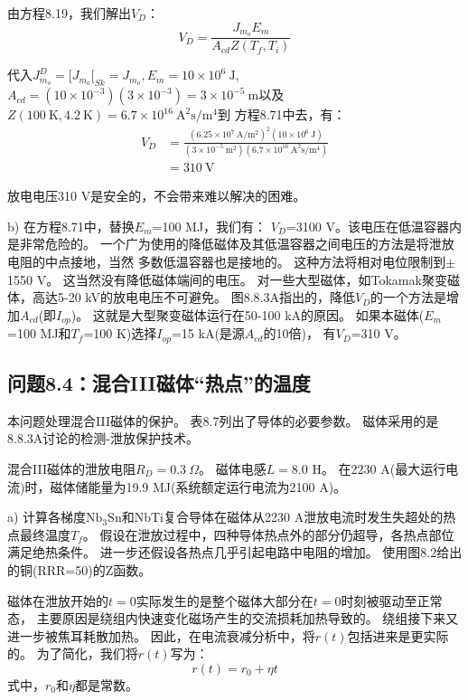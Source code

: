 由方程8.19，我们解出$V_D$：
\begin{equation}%
V_D=\frac{J_{m_o}E_m}{A_{cd}Z(T_f,T_i)}
\end{equation}

代入$J_{m_o}^D=[J_{m_o}[_{Sk}=J_{m_o}, E_m=10\times 10^6\ \mathrm{J}$,
$A_{cd}=(10\times 10^{-3})(3\times 10^{-3})=3\times 10^{-5}\ \mathrm{m}$以及
$Z(100\ \mathrm{K},4.2\ \mathrm{K})=6.7\times 10^{16}\ \mathrm{A^2 s/m^4}$到
方程8.71中去，有：
\begin{align*}%
V_D&=\frac{(6.25\times 10^7\ \mathrm{A/m^2})^2(10\times 10^6\ \mathrm{J})}{(3\times 10^{-5}\ \mathrm{m^2})(6.7\times 10^{16}\ \mathrm{A^2s/m^4})} \\\tag{S3.1}
&=310\ \mathrm{V} 
\end{align*}

放电电压310 V是安全的，不会带来难以解决的困难。

b) 在方程8.71中，替换$E_m$=100 MJ，我们有：
$V_D$=3100 V。该电压在低温容器内是非常危险的。
一个广为使用的降低磁体及其低温容器之间电压的方法是将泄放电阻的中点接地，当然
多数低温容器也是接地的。
这种方法将相对电位限制到$\pm$1550 V。
这当然没有降低磁体端间的电压。
对一些大型磁体，如Tokamak聚变磁体，高达5-20 kV的放电电压不可避免。
图8.8.3A指出的，降低$V_D$的一个方法是增加$A_{cd}$(即$I_{op}$)。
这就是大型聚变磁体运行在50-100 kA的原因。
如果本磁体($E_m$=100 MJ和$T_f$=100 K)选择$I_{op}$=15 kA(是源$A_{cd}$的10倍)，
有$V_D$=310 V。


\subsection{问题8.4：混合III磁体“热点”的温度}
本问题处理混合III磁体的保护。
表8.7列出了导体的必要参数。
磁体采用的是8.8.3A讨论的检测-泄放保护技术。

混合III磁体的泄放电阻$R_D=0.3\ \Omega$。
磁体电感$L=8.0$ H。
在2230 A(最大运行电流)时，磁体储能量为19.9 MJ(系统额定运行电流为2100 A)。

a) 计算各梯度$\mathrm{Nb_3Sn}$和NbTi复合导体在磁体从2230 A泄放电流时发生失超处的热点最终温度$T_f$。
假设在泄放过程中，四种导体热点外的部分仍超导，各热点部位满足绝热条件。
进一步还假设各热点几乎引起电路中电阻的增加。
使用图8.2给出的铜(RRR=50)的Z函数。

磁体在泄放开始的$t=0$实际发生的是整个磁体大部分在$t=0$时刻被驱动至正常态，
主要原因是绕组内快速变化磁场产生的交流损耗加热导致的。
绕组接下来又进一步被焦耳耗散加热。
因此，在电流衰减分析中，将$r(t)$包括进来是更实际的。
为了简化，我们将$r(t)$写为：
\begin{equation}%
r(t)=r_0+\eta t
\end{equation}
式中，$r_0$和$\eta$都是常数。

